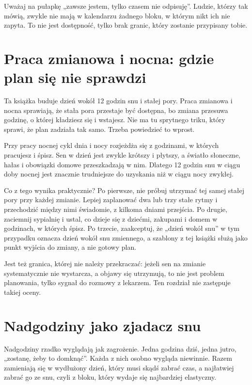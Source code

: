 Uważaj na pułapkę „zawsze jestem, tylko czasem nie odpisuję”. Ludzie, którzy tak mówią, zwykle nie mają w kalendarzu żadnego bloku, w którym nikt ich nie zapyta. To nie jest dostępność, tylko brak granic, który zostanie przypisany tobie.

\section{Praca zmianowa i nocna: gdzie plan się nie sprawdzi}

Ta książka buduje dzień wokół 12 godzin snu i stałej pory. Praca zmianowa i nocna sprawiają, że stała pora przestaje być dostępna, bo zmiana przesuwa godzinę, o której kładziesz się i wstajesz. Nie ma tu sprytnego triku, który sprawi, że plan zadziała tak samo. Trzeba powiedzieć to wprost.

Przy pracy nocnej cykl dnia i nocy rozjeżdża się z godzinami, w których pracujesz i śpisz. Sen w dzień jest zwykle krótszy i płytszy, a światło słoneczne, hałas i obowiązki domowe przeszkadzają w nim. Dlatego 12 godzin snu w ciągu doby nocnej jest znacznie trudniejsze do uzyskania niż w ciągu nocy zwykłej.

Co z tego wynika praktycznie? Po pierwsze, nie próbuj utrzymać tej samej stałej pory przy każdej zmianie. Lepiej zaplanować dwa lub trzy stałe rytmy i przechodzić między nimi świadomie, z kilkoma dniami przejścia. Po drugie, zaciemnij sypialnię i ustal, co dzieje się z dziećmi, zakupami i domem w godzinach, w których śpisz. Po trzecie, zaakceptuj, że „dzień wokół snu” w tym przypadku oznacza dzień wokół snu zmiennego, a szablony z tej książki służą jako punkt wyjścia do zmiany, a nie gotowy plan.

Jest też granica, której nie należy przekraczać: jeżeli sen na zmianie systematycznie nie wystarcza, a objawy się utrzymują, to nie jest problem planowania, tylko sygnał do rozmowy z lekarzem. Ten rozdział nie zastępuje takiej oceny.

\section{Nadgodziny jako zjadacz snu}

Nadgodziny rzadko wyglądają jak zagrożenie. Jedna godzina dziś, jedna jutro, „zostanę, żeby to domknąć”. Każda z nich osobno wygląda niewinnie. Razem zamieniają się w wydłużony dzień, który musi skądś zabrać czas, a najłatwiej zabrać go ze snu, czyli z bloku, który wydaje się najbardziej elastyczny.

